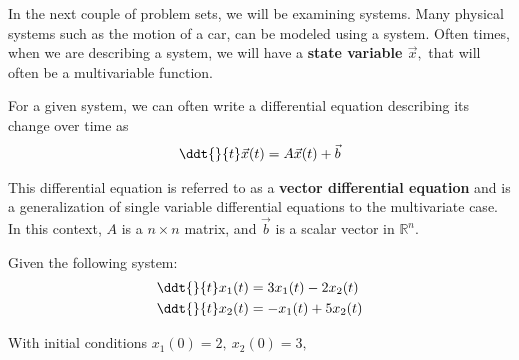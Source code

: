 

In the next couple of problem sets, we will be examining systems. 
Many physical systems such as the motion of a car, can be modeled using a system.
Often times, when we are describing a system, we will have a \textbf{state variable $\vec{x},$}
that will often be a multivariable function. 

For a given system, we can often write a differential equation describing its change over time as
\begin{align}
\ddt{}{t}\vec{x}(t) = A \vec{x}(t) + \vec{b}
\end{align}

This differential equation is referred to as a \textbf{vector differential equation} 
and is a generalization of single variable differential equations to the multivariate case.
In this context, $A$ is a $n \times n$ matrix, and $\vec{b}$ is a scalar vector in $\mathbb{R}^n.$

Given the following system:
\begin{align*}
    \ddt{}{t}x_{1}(t) &= 3 x_{1}(t) - 2 x_{2}(t) \\
    \ddt{}{t}x_{2}(t) &= - x_{1}(t) + 5 x_{2}(t)
\end{align*}

With initial conditions $x_{1}(0) = 2, \ x_{2}(0) = 3,$

